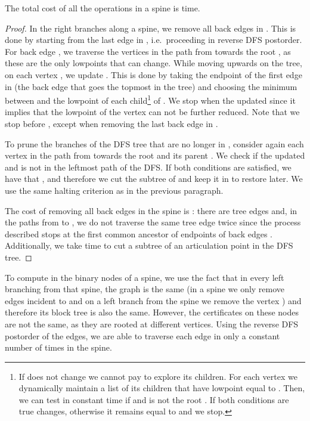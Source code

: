 \begin{lemma}
	\label{lem:removebackedge}
	The total cost of all the operations  in a
        spine is  time.
\end{lemma}
\begin{proof}
	In the right branches along a spine, we remove all back edges
        in . This is done by starting from the last edge in
        , i.e.~proceeding in reverse DFS postorder.
For back edge , we traverse the vertices in the
	path from  towards the root , as these are the only lowpoints
	that can change.
While moving upwards on the tree, on each vertex , we
        update . This is done by taking the
        endpoint  of the first edge in  (the back edge that
        goes the topmost in the tree) and choosing the minimum between
         and the lowpoint of each child\footnote{If
           does not change we cannot pay to
          explore its children. For each vertex we dynamically
          maintain a list  of its children that have lowpoint
          equal to . Then, we can test in constant time if
           and  is not the root . If both
          conditions are true  changes,
          otherwise it remains equal to  and we stop.} of
        . We stop when the updated  since it implies that the lowpoint of the vertex
        can not be further reduced.  Note that we stop before ,
        except when removing the last back edge in .

	To prune the branches of the DFS tree that are no longer in
        , consider again each vertex  in the path from
         towards the root  and its parent . We check if the
        updated  and  is not
        in the leftmost path of the DFS. If both conditions are
        satisfied, we have that , and therefore we
        cut the subtree of  and keep it in  to restore later. We
        use the same halting criterion as in the previous paragraph.
	
	The cost of removing all back edges in the spine is
	: there are  tree edges and, in the paths
	from  to , we do not traverse the same tree edge twice
	since the process described stops at the first common ancestor
	of endpoints of back edges . Additionally, we take 
	time to cut a subtree of an articulation point in the DFS tree. 
\end{proof}


To compute  in the binary nodes of a spine, we use
the fact that in every left branching from that spine, the graph is
the same (in a spine we only remove edges incident to  and on a
left branch from the spine we remove the vertex ) and therefore its
block tree is also the same. However, the certificates on these nodes
are not the same, as they are rooted at different vertices. Using
the reverse DFS postorder of the edges, we are able to traverse
each edge in  only a constant number of times in the spine.


